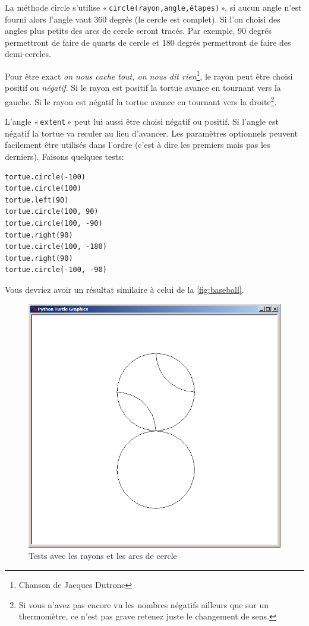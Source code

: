 La méthode circle s'utilise « \texttt{circle(rayon,angle,étapes)} », si aucun angle n'est fourni alors l'angle vaut 360 degrés (le cercle est complet). Si l'on choisi des angles plus petits des arcs de cercle seront tracés. Par exemple, 90 degrés permettront de faire de quarts de cercle et 180 degrés permettront de faire des demi-cercles.

Pour être exact \emph{on nous cache tout, on nous dit rien}\footnote{Chanson de Jacques Dutronc}, le rayon peut être choisi positif ou \emph{négatif}. Si le rayon est positif la tortue avance en tournant vers la gauche. Si le rayon est négatif la tortue avance en tournant vers la droite\footnote{Si vous n'avez pas encore vu les nombres négatifs ailleurs que sur un thermomètre, ce n'est pas grave retenez juste le changement de sens.}.

L'angle « \texttt{extent} » peut lui aussi être choisi négatif ou positif. Si l'angle est négatif la tortue va reculer au lieu d'avancer. Les paramètres optionnels peuvent facilement être utilisés dans l'ordre (c'est à dire les premiers mais pas les derniers). Faisons quelques tests:

\begin{Verbatim}[frame=single,rulecolor=\color{mbleu}, label=à taper]
tortue.circle(-100)
tortue.circle(100)
tortue.left(90)
tortue.circle(100, 90)
tortue.circle(100, -90)
tortue.right(90)
tortue.circle(100, -180)
tortue.right(90)
tortue.circle(-100, -90)
\end{Verbatim}

Vous devriez avoir un résultat similaire à celui de la \autoref{fig:baseball}.

\begin{figure}[H]
\centering
\includegraphics[scale=0.4]{images/baseball}
\caption{Tests avec les rayons et les arcs de cercle}\label{fig:baseball}
\end{figure}

